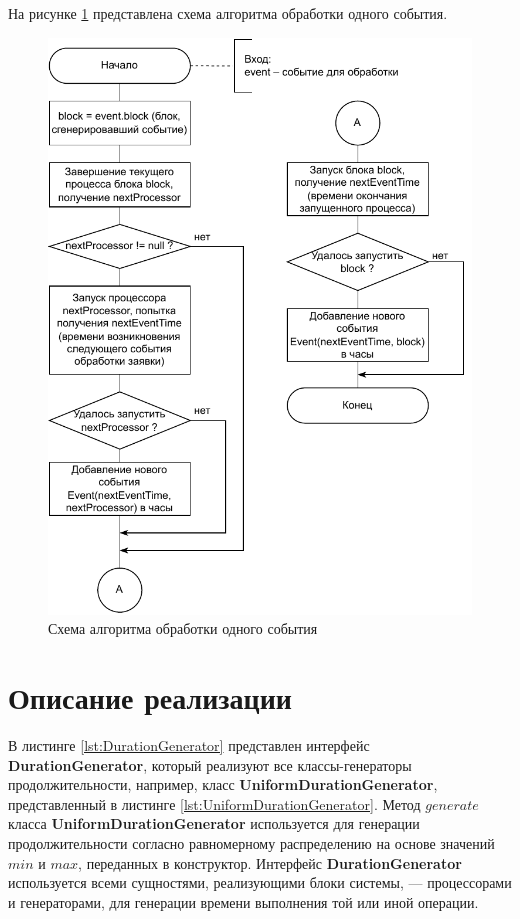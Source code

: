 \documentclass{bmstu}
\begin{document}
\clearpage
На рисунке \ref{img:hybrid_processEvent_schema} представлена схема алгоритма обработки одного события.
\begin{figure}[h!btp]
	\centering
	\includegraphics[width=0.8\columnwidth]{inc/img/hybrid_processEvent_schema.pdf}
	\caption{Схема алгоритма обработки одного события}
	\label{img:hybrid_processEvent_schema}	
\end{figure}

\section{Описание реализации}

В листинге \ref{lst:DurationGenerator} представлен интерфейс \textbf{DurationGenerator}, который реализуют все классы-генераторы продолжительности, например, класс \textbf{UniformDurationGenerator}, представленный в листинге \ref{lst:UniformDurationGenerator}. Метод $generate$ класса \textbf{UniformDurationGenerator} используется для генерации продолжительности согласно равномерному распределению на основе значений $min$ и $max$, переданных в конструктор. Интерфейс \textbf{DurationGenerator} используется всеми сущностями, реализующими блоки системы, --- процессорами и генераторами, для генерации времени выполнения той или иной операции.
\end{document}
